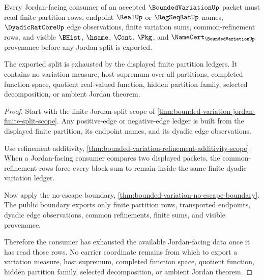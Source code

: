 \begin{theorem}
\label{thm:bounded-variation-jordan-consumer-exhaustion}
Every Jordan-facing consumer of an accepted $\BoundedVariationUp$ packet must read finite partition rows, endpoint $\RealUp$ or $\RegSeqRatUp$ names, $\DyadicRatCoreUp$ edge observations, finite variation sums, common-refinement rows, and visible $\BHist$, $\hsame$, $\Cont$, $\Pkg$, and $\NameCert_{\BoundedVariationUp}$ provenance before any Jordan split is exported.

The exported split is exhausted by the displayed finite partition ledgers. It contains no variation measure, host supremum over all partitions, completed function space, quotient real-valued function, hidden partition family, selected decomposition, or ambient Jordan theorem.
\end{theorem}
\begin{proof}
Start with the finite Jordan-split scope of \autoref{thm:bounded-variation-jordan-finite-split-scope}. Any positive-edge or negative-edge ledger is built from the displayed finite partition, its endpoint names, and its dyadic edge observations.

Use refinement additivity, \autoref{thm:bounded-variation-refinement-additivity-scope}. When a Jordan-facing consumer compares two displayed packets, the common-refinement rows force every block sum to remain inside the same finite dyadic variation ledger.

Now apply the no-escape boundary, \autoref{thm:bounded-variation-no-escape-boundary}. The public boundary exports only finite partition rows, transported endpoints, dyadic edge observations, common refinements, finite sums, and visible provenance.

Therefore the consumer has exhausted the available Jordan-facing data once it has read those rows. No carrier coordinate remains from which to export a variation measure, host supremum, completed function space, quotient function, hidden partition family, selected decomposition, or ambient Jordan theorem.
\end{proof}

